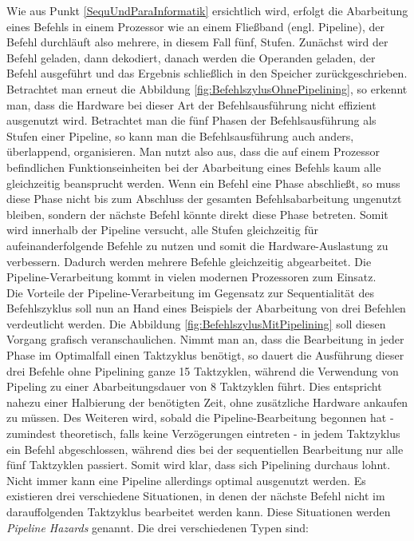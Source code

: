 				Wie aus Punkt \ref{SequUndParaInformatik} ersichtlich wird, erfolgt die Abarbeitung eines Befehls in einem Prozessor wie an einem Fließband (engl. Pipeline), der Befehl durchläuft also mehrere, in diesem Fall fünf, Stufen. Zunächst wird der Befehl geladen, dann dekodiert, danach werden die Operanden geladen, der Befehl ausgeführt und das Ergebnis schließlich in den Speicher zurückgeschrieben.\\
				Betrachtet man erneut die Abbildung \ref{fig:BefehlszylusOhnePipelining}, so erkennt man, dass die Hardware bei dieser Art der Befehlsausführung nicht effizient ausgenutzt wird. Betrachtet man die fünf Phasen der Befehlsausführung als Stufen einer Pipeline, so kann man die Befehlsausführung auch anders, überlappend, organisieren. Man nutzt also aus, dass die auf einem Prozessor befindlichen Funktionseinheiten bei der Abarbeitung eines Befehls kaum alle gleichzeitig beansprucht werden. Wenn ein Befehl eine Phase abschließt, so muss diese Phase nicht bis zum Abschluss der gesamten Befehlsabarbeitung ungenutzt bleiben, sondern der nächste Befehl könnte direkt diese Phase betreten. Somit wird innerhalb der Pipeline versucht, alle Stufen gleichzeitig für aufeinanderfolgende Befehle zu nutzen und somit die Hardware-Auslastung zu verbessern. Dadurch werden mehrere Befehle gleichzeitig abgearbeitet. Die Pipeline-Verarbeitung kommt in vielen modernen Prozessoren zum Einsatz.\\
				Die Vorteile der Pipeline-Verarbeitung im Gegensatz zur Sequentialität des Befehlszyklus soll nun an Hand eines Beispiels der Abarbeitung von drei Befehlen verdeutlicht werden.
				Die Abbildung \ref{fig:BefehlszylusMitPipelining} soll diesen Vorgang grafisch veranschaulichen. Nimmt man an, dass die Bearbeitung in jeder Phase im Optimalfall einen Taktzyklus benötigt, so dauert die Ausführung dieser drei Befehle ohne Pipelining ganze 15 Taktzyklen, während die Verwendung von Pipeling zu einer Abarbeitungsdauer von 8 Taktzyklen führt. Dies entspricht nahezu einer Halbierung der benötigten Zeit, ohne zusätzliche Hardware ankaufen zu müssen. Des Weiteren wird, sobald die Pipeline-Bearbeitung begonnen hat - zumindest theoretisch, falls keine Verzögerungen eintreten - in jedem Taktzyklus ein Befehl abgeschlossen, während dies bei der sequentiellen Bearbeitung nur alle fünf Taktzyklen passiert. Somit wird klar, dass sich Pipelining durchaus lohnt.\\
				Nicht immer kann eine Pipeline allerdings optimal ausgenutzt werden. Es existieren drei verschiedene Situationen, in denen der nächste Befehl nicht im darauffolgenden Taktzyklus bearbeitet werden kann. Diese Situationen werden \textit{Pipeline Hazards} genannt. Die drei verschiedenen Typen sind:
				
